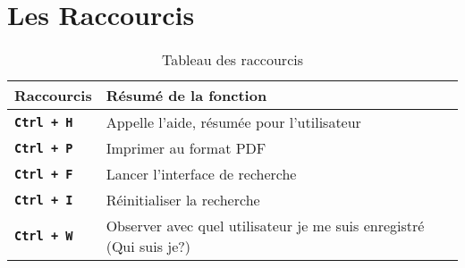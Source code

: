 \chapter{Les Raccourcis}\label{chap:raccourcis}

\newcommand{\yerothraccouci}[1]{\textbf{\texttt{#1}}}



\begin{table}[!htbp]
\centering
\begin{tabular}{l|l}

Raccourcis									&
R\'esum\'e de la fonction					\\ \hline \hline

\yerothraccouci{Ctrl + H}					&
Appelle l'aide, r\'esum\'ee pour l'utilisateur	\\ \hline

\yerothraccouci{Ctrl + P}					&
Imprimer au format PDF						\\ \hline

\yerothraccouci{Ctrl + F}					&
Lancer l'interface de recherche				\\ \hline

\yerothraccouci{Ctrl + I}					&
R\'einitialiser la recherche				\\ \hline

\yerothraccouci{Ctrl + W}					&
Observer avec quel utilisateur
je me suis enregistr\'e (Qui suis je?)		
\end{tabular}
\caption{Tableau des raccourcis}
\label{tab:raccourcis}
\end{table}
